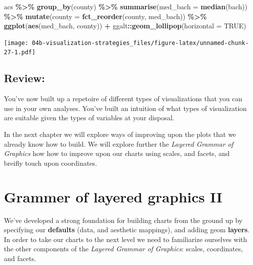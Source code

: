 \documentclass[
]{book}
\newenvironment{Shaded}{\begin{snugshade}}{\end{snugshade}}
\newcommand{\DataTypeTok}[1]{\textcolor[rgb]{0.13,0.29,0.53}{#1}}
\newcommand{\KeywordTok}[1]{\textcolor[rgb]{0.13,0.29,0.53}{\textbf{#1}}}
\newcommand{\NormalTok}[1]{#1}
\newcommand{\OperatorTok}[1]{\textcolor[rgb]{0.81,0.36,0.00}{\textbf{#1}}}
\newcommand{\OtherTok}[1]{\textcolor[rgb]{0.56,0.35,0.01}{#1}}
\newcommand{\StringTok}[1]{\textcolor[rgb]{0.31,0.60,0.02}{#1}}
\begin{document}
\begin{Shaded}
\begin{Highlighting}[]
\NormalTok{acs }\OperatorTok{\%\textgreater{}\%}\StringTok{ }
\StringTok{  }\KeywordTok{group\_by}\NormalTok{(county) }\OperatorTok{\%\textgreater{}\%}\StringTok{ }
\StringTok{  }\KeywordTok{summarise}\NormalTok{(}\DataTypeTok{med\_bach =} \KeywordTok{median}\NormalTok{(bach)) }\OperatorTok{\%\textgreater{}\%}\StringTok{ }
\StringTok{  }\KeywordTok{mutate}\NormalTok{(}\DataTypeTok{county =} \KeywordTok{fct\_reorder}\NormalTok{(county, med\_bach)) }\OperatorTok{\%\textgreater{}\%}\StringTok{ }
\StringTok{  }\KeywordTok{ggplot}\NormalTok{(}\KeywordTok{aes}\NormalTok{(med\_bach, county)) }\OperatorTok{+}\StringTok{ }
\StringTok{  }\NormalTok{ggalt}\OperatorTok{::}\KeywordTok{geom\_lollipop}\NormalTok{(}\DataTypeTok{horizontal =} \OtherTok{TRUE}\NormalTok{)}
\end{Highlighting}
\end{Shaded}

\texttt{[image: 04b-visualization-strategies\_files/figure-latex/unnamed-chunk-27-1.pdf]}

\hypertarget{review}{%
\section{Review:}\label{review}}

You've now built up a repetoire of different types of visualizations that you can use in your own analyses. You've built an intuition of what types of visualization are suitable given the types of variables at your disposal.

In the next chapter we will explore ways of improving upon the plots that we already know how to build. We will explore further the \emph{Layered Grammar of Graphics} how how to improve upon our charts using scales, and facets, and breifly touch upon coordinates.

\hypertarget{grammer-of-layered-graphics-ii}{%
\chapter{Grammer of layered graphics II}\label{grammer-of-layered-graphics-ii}}

We've developed a strong foundation for building charts from the ground up by specifying our \textbf{defaults} (data, and aesthetic mappings), and adding geom \textbf{layers}. In order to take our charts to the next level we need to familiarize ourselves with the other components of the \emph{Layered Grammar of Graphics}: scales, coordinates, and facets.
\end{document}
